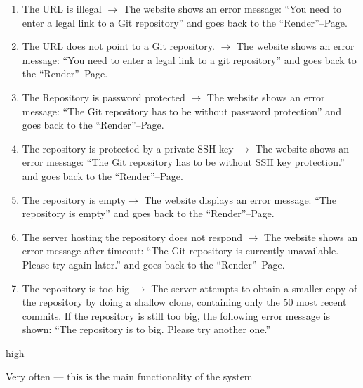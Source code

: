 \documentclass[11pt]{scrartcl}
\begin{document}
\begin{description}[leftmargin=!,labelwidth=\widthof{\bfseries Frequency of use:}]
	\item[Exceptions:]
		\begin{enumerate}[leftmargin=1.5em]
			\item The URL is illegal $\rightarrow$ The website shows an error message:
				\enquote{You need to enter a legal link to a Git repository} and goes
				back to the \enquote{Render}--Page.
			\item The URL does not point to a Git repository. $\rightarrow$  The website
				shows an error message: \enquote{You need to enter a legal link to a git
				repository} and goes back to the \enquote{Render}--Page.
			\item The Repository is password protected $\rightarrow$ The website shows an
				error message: \enquote{The Git repository has to be without password
				protection} and goes back to the \enquote{Render}--Page.
			\item The repository is protected by a private SSH key $\rightarrow$ The
				website shows an error message: \enquote{The Git repository has to be
				without SSH key protection.} and goes back to the
				\enquote{Render}--Page.
			\item The repository is empty$\rightarrow$ The website displays an error
				message: \enquote{The repository is empty} and goes back to the
				\enquote{Render}--Page.
			\item The server hosting the repository does not respond $\rightarrow$ The
				website shows an error message after timeout: \enquote{The Git
				repository is currently unavailable. Please try again later.} and goes
				back to the \enquote{Render}--Page. 
			\item The repository is too big $\rightarrow$  The server attempts to obtain a
				smaller copy of the repository by doing a shallow clone, containing only
				the 50 most recent commits. If the repository is still too big, the
				following error message is shown: \enquote{The repository is to big. Please try another one.}
		\end{enumerate}

	\item[Priority:] high
	\item[Frequency of use:] Very often --- this is the main functionality of the system

\end{description}
\end{document}
